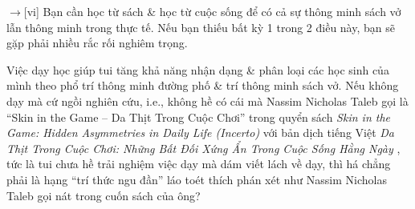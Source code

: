 \documentclass[12pt,oneside]{book}
\begin{document}
{\sf[en]$\to$[vi]} Bạn cần học từ sách \& học từ cuộc sống để có cả sự thông minh sách vở lẫn thông minh trong thực tế. Nếu bạn thiếu bất kỳ 1 trong 2 điều này, bạn sẽ gặp phải nhiều rắc rối nghiêm trọng.

Việc dạy học giúp tui tăng khả năng nhận dạng \& phân loại các học sinh của mình theo phổ trí thông minh đường phố \& trí thông minh sách vở. Nếu không dạy mà cứ ngồi nghiên cứu, i.e., không hề có cái mà {\sc Nassim Nicholas Taleb} gọi là ``Skin in the Game -- Da Thịt Trong Cuộc Chơi'' trong quyển sách {\it Skin in the Game: Hidden Asymmetries in Daily Life (Incerto)} \cite{Taleb_skin_game} với bản dịch tiếng Việt {\it Da Thịt Trong Cuộc Chơi: Những Bất Đối Xứng Ẩn Trong Cuộc Sống Hằng Ngày} \cite{Taleb_skin_game_VN}, tức là tui chưa hề trải nghiệm việc dạy mà dám viết lách về dạy, thì há chẳng phải là hạng ``trí thức ngu đần'' láo toét  thích phán xét như {\sc Nassim Nicholas Taleb} gọi nát trong cuốn sách của ông?
\end{document}

